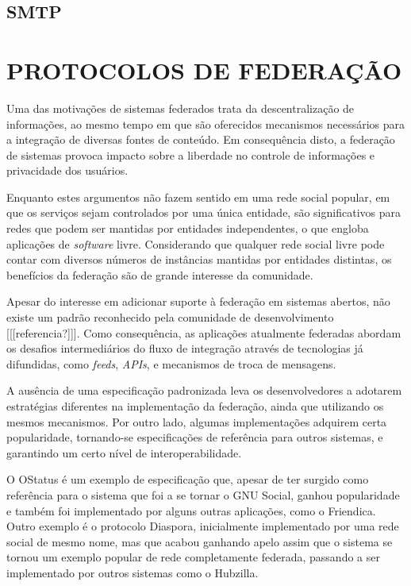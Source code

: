 

\subsection{SMTP}



\section{PROTOCOLOS DE FEDERAÇÃO}


Uma das motivações de sistemas federados trata da descentralização de informações, ao
mesmo tempo em que são oferecidos mecanismos necessários para a integração de
diversas fontes de conteúdo. Em consequência disto, a federação de sistemas provoca
impacto sobre a liberdade no controle de informações e privacidade dos usuários.

Enquanto estes argumentos não fazem sentido em uma rede social popular, em que os
serviços sejam controlados por uma única entidade, são significativos para redes que
podem ser mantidas por entidades independentes, o que engloba aplicações de
\textit{software} livre. Considerando que qualquer rede social livre pode contar com
diversos números de instâncias mantidas por entidades distintas, os benefícios da
federação são de grande interesse da comunidade.

Apesar do interesse em adicionar suporte à federação em sistemas abertos, não existe
um padrão reconhecido pela comunidade de desenvolvimento [[[referencia?]]]. Como
consequência, as aplicações atualmente federadas abordam os desafios intermediários
do fluxo de integração através de tecnologias já difundidas, como \textit{feeds},
\textit{APIs}, e mecanismos de troca de mensagens.

A ausência de uma especificação padronizada leva os desenvolvedores a adotarem
estratégias diferentes na implementação da federação, ainda que utilizando os mesmos
mecanismos. Por outro lado, algumas implementações adquirem certa popularidade,
tornando-se especificações de referência para outros sistemas, e garantindo um certo
nível de interoperabilidade.

O OStatus é um exemplo de especificação que, apesar de ter surgido como referência
para o sistema que foi a se tornar o GNU Social, ganhou popularidade e também foi
implementado por alguns outras aplicações, como o Friendica. Outro exemplo é o
protocolo Diaspora, inicialmente implementado por uma rede social de mesmo nome, mas
que acabou ganhando apelo assim que o sistema se tornou um exemplo popular de rede
completamente federada, passando a ser implementado por outros sistemas como o
Hubzilla.

